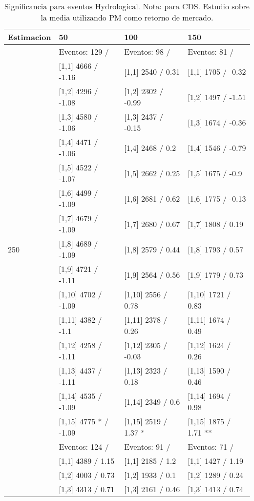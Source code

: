 \begin{table}

\caption{Significancia para eventos Hydrological. Nota: para CDS. Estudio sobre la media utilizando PM como retorno de mercado.}
\centering
\begin{tabular}[t]{llll}
\toprule
Estimacion & 50 & 100 & 150\\
\midrule
 & Eventos:  129 / & Eventos:  98 / & Eventos:  81 /\\
 & {}[1,1] 4666  / -1.16 & {}[1,1] 2540  / 0.31 & {}[1,1] 1705  / -0.32\\
 & {}[1,2] 4296  / -1.08 & {}[1,2] 2302  / -0.99 & {}[1,2] 1497  / -1.51\\
 & {}[1,3] 4580  / -1.06 & {}[1,3] 2437  / -0.15 & {}[1,3] 1674  / -0.36\\
 & {}[1,4] 4471  / -1.06 & {}[1,4] 2468  / 0.2 & {}[1,4] 1546  / -0.79\\
\addlinespace
 & {}[1,5] 4522  / -1.07 & {}[1,5] 2662  / 0.25 & {}[1,5] 1675  / -0.9\\
 & {}[1,6] 4499  / -1.09 & {}[1,6] 2681  / 0.62 & {}[1,6] 1775  / -0.13\\
 & {}[1,7] 4679  / -1.09 & {}[1,7] 2680  / 0.67 & {}[1,7] 1808  / 0.19\\
250 & {}[1,8] 4689  / -1.09 & {}[1,8] 2579  / 0.44 & {}[1,8] 1793  / 0.57\\
 & {}[1,9] 4721  / -1.11 & {}[1,9] 2564  / 0.56 & {}[1,9] 1779  / 0.73\\
\addlinespace
 & {}[1,10] 4702  / -1.09 & {}[1,10] 2556  / 0.78 & {}[1,10] 1721  / 0.83\\
 & {}[1,11] 4382  / -1.1 & {}[1,11] 2378  / 0.26 & {}[1,11] 1674  / 0.49\\
 & {}[1,12] 4258  / -1.11 & {}[1,12] 2305  / -0.03 & {}[1,12] 1624  / 0.26\\
 & {}[1,13] 4437  / -1.11 & {}[1,13] 2323  / 0.18 & {}[1,13] 1590  / 0.46\\
 & {}[1,14] 4535  / -1.09 & {}[1,14] 2349  / 0.6 & {}[1,14] 1694  / 0.98\\
\addlinespace
 & {}[1,15] 4775 * / -1.09 & {}[1,15] 2519  / 1.37 * & {}[1,15] 1875  / 1.71 **\\
 & Eventos:  124 / & Eventos:  91 / & Eventos:  71 /\\
 & {}[1,1] 4389  / 1.15 & {}[1,1] 2185  / 1.2 & {}[1,1] 1427  / 1.19\\
 & {}[1,2] 4003  / 0.73 & {}[1,2] 1933  / 0.1 & {}[1,2] 1289  / 0.24\\
 & {}[1,3] 4313  / 0.71 & {}[1,3] 2161  / 0.46 & {}[1,3] 1413  / 0.74\\

\end{tabular}
\end{table}
